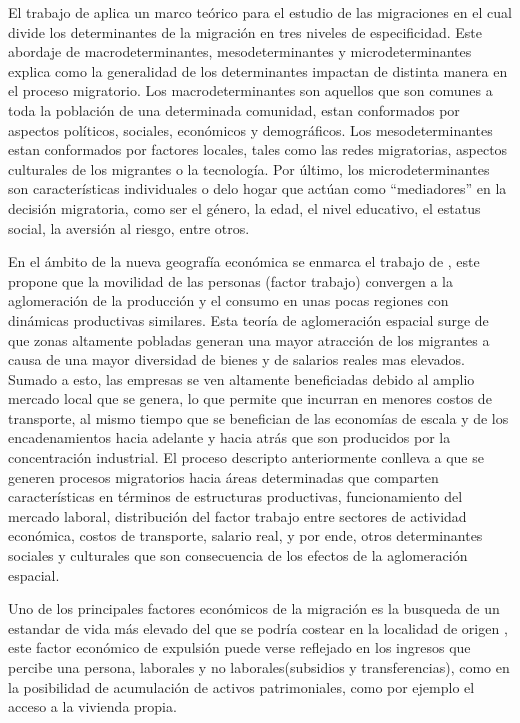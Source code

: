 \documentclass[12pt,a4paper]{article}
\begin{document}
El trabajo de \textcite{kuhnt_literature_2019} aplica un marco teórico para el estudio de las migraciones en el cual divide los determinantes de la migración en tres niveles de especificidad. Este abordaje de macrodeterminantes, mesodeterminantes y microdeterminantes explica como la generalidad de los determinantes impactan de distinta manera en el proceso migratorio. Los macrodeterminantes son aquellos que son comunes a toda la población de una determinada comunidad, estan conformados por aspectos políticos, sociales, económicos y demográficos. Los mesodeterminantes estan conformados por factores locales, tales como las redes migratorias, aspectos culturales de los migrantes o la tecnología. Por último, los microdeterminantes son características individuales o delo hogar que actúan como “mediadores” en la decisión migratoria, como ser el género, la edad, el nivel educativo, el estatus social, la aversión al riesgo, entre otros. 

En el ámbito de la nueva geografía económica se enmarca el trabajo de \textcite{krugman_increasing_1991}, este  propone que la movilidad de las personas (factor trabajo) convergen a la aglomeración de la producción y el consumo en unas pocas regiones con dinámicas productivas similares. Esta teoría de aglomeración espacial surge de que  zonas altamente pobladas generan una mayor atracción de los migrantes a causa de una mayor diversidad de bienes y de salarios reales mas elevados. Sumado a esto, las empresas se ven altamente beneficiadas debido al amplio mercado local que se genera, lo que permite que incurran en menores costos de transporte, al mismo tiempo que se benefician de las economías de escala y de los encadenamientos hacia adelante y hacia atrás que son producidos por la concentración industrial. El proceso descripto anteriormente conlleva a que se generen procesos migratorios hacia áreas determinadas que comparten características en términos de estructuras productivas, funcionamiento del mercado laboral, distribución del factor trabajo entre sectores de actividad económica, costos de transporte, salario real, y por ende, otros determinantes sociales y culturales que son consecuencia de los efectos de la aglomeración espacial.

Uno de los principales factores económicos de la migración es la busqueda de un estandar de vida más elevado del que se podría costear en la localidad de origen \parencite{simpson_demographic_2017}, este factor económico de expulsión  puede verse reflejado en los ingresos que percibe una persona, laborales y no laborales(subsidios y transferencias), como en la posibilidad de acumulación de activos patrimoniales, como por ejemplo el acceso a la vivienda propia. 
\end{document}
